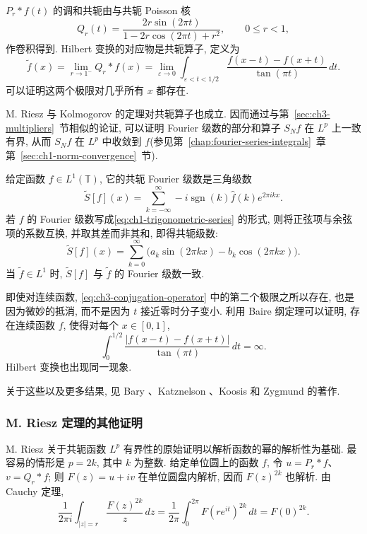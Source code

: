 \hypertarget{chapter-03-page-074}{}
$P_r*f(t)$ 的调和共轭由与共轭 Poisson 核
\[
 Q_r(t)=\frac{2r\sin(2\pi t)}{1-2r\cos(2\pi t)+r^2},
 \qquad 0\le r<1,
\]
作卷积得到. Hilbert 变换的对应物是共轭算子, 定义为
\begin{equation}
\label{eq:ch3-conjugation-operator}
 \widetilde f(x)=\lim_{r\to1^-}Q_r*f(x)
 =\lim_{\varepsilon\to0}\int_{\varepsilon<t<1/2}
 \frac{f(x-t)-f(x+t)}{\tan(\pi t)}\,dt.
\end{equation}
可以证明这两个极限对几乎所有 $x$ 都存在.

M. Riesz 与 Kolmogorov 的定理对共轭算子也成立. 因而通过与第~\ref{sec:ch3-multipliers}~节相似的论证, 可以证明 Fourier 级数的部分和算子 $S_Nf$ 在 $L^p$ 上一致有界, 从而 $S_Nf$ 在 $L^p$ 中收敛到 $f$(参见第~\ref{chap:fourier-series-integrals}~章第~\ref{sec:ch1-norm-convergence}~节).

给定函数 $f\in L^1(\mathbb T)$, 它的共轭 Fourier 级数是三角级数
\[
 \widetilde S[f](x)=\sum_{k=-\infty}^{\infty}
 -i\operatorname{sgn}(k)\widehat f(k)e^{2\pi ikx}.
\]
若 $f$ 的 Fourier 级数写成\eqref{eq:ch1-trigonometric-series} 的形式, 则将正弦项与余弦项的系数互换, 并取其差而非其和, 即得共轭级数:
\[
 \widetilde S[f](x)=\sum_{k=0}^{\infty}
 \bigl(a_k\sin(2\pi kx)-b_k\cos(2\pi kx)\bigr).
\]
当 $\widetilde f\in L^1$ 时, $\widetilde S[f]$ 与 $\widetilde f$ 的 Fourier 级数一致.

即使对连续函数, \eqref{eq:ch3-conjugation-operator} 中的第二个极限之所以存在, 也是因为微妙的抵消, 而不是因为 $t$ 接近零时分子变小. 利用 Baire 纲定理可以证明, 存在连续函数 $f$, 使得对每个 $x\in[0,1]$,
\[
 \int_0^{1/2}\frac{|f(x-t)-f(x+t)|}{\tan(\pi t)}\,dt=\infty.
\]
Hilbert 变换也出现同一现象.

关于这些以及更多结果, 见 Bary 、Katznelson 、Koosis  和 Zygmund  的著作.

\subsubsection{M. Riesz 定理的其他证明}
\label{subsec:ch3-other-riesz-proofs}

M. Riesz 关于共轭函数 $L^p$ 有界性的原始证明以解析函数的幂的解析性为基础. 最容易的情形是 $p=2k$, 其中 $k$ 为整数. 给定单位圆上的函数 $f$, 令 $u=P_r*f$、$v=Q_r*f$; 则 $F(z)=u+iv$ 在单位圆盘内解析, 因而 $F(z)^{2k}$ 也解析. 由 Cauchy 定理,
\[
 \frac1{2\pi i}\int_{|z|=r}\frac{F(z)^{2k}}z\,dz
 =\frac1{2\pi}\int_0^{2\pi}F(re^{it})^{2k}\,dt
 =F(0)^{2k}.
\]

